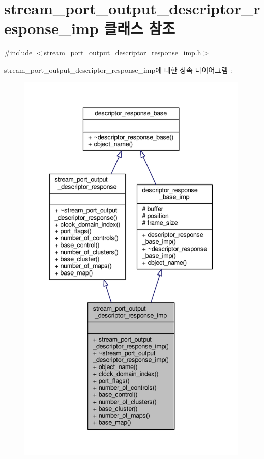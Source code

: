 \hypertarget{classavdecc__lib_1_1stream__port__output__descriptor__response__imp}{}\section{stream\+\_\+port\+\_\+output\+\_\+descriptor\+\_\+response\+\_\+imp 클래스 참조}
\label{classavdecc__lib_1_1stream__port__output__descriptor__response__imp}


{\ttfamily \#include $<$stream\+\_\+port\+\_\+output\+\_\+descriptor\+\_\+response\+\_\+imp.\+h$>$}



stream\+\_\+port\+\_\+output\+\_\+descriptor\+\_\+response\+\_\+imp에 대한 상속 다이어그램 \+: 
\nopagebreak
\begin{figure}[H]
\begin{center}
\leavevmode
\includegraphics[height=550pt]{classavdecc__lib_1_1stream__port__output__descriptor__response__imp__inherit__graph}
\end{center}
\end{figure}


